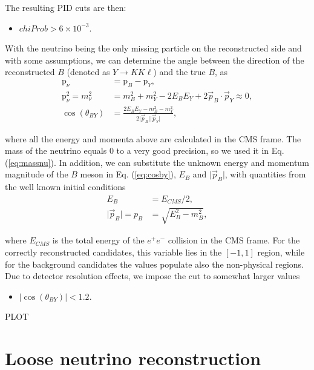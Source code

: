 \documentclass[oneside,a4paper,openany,12pt]{scrbook}
\begin{document}
The resulting PID cuts are then:
\begin{itemize}
\item $chiProb > 6\times 10^{-3}$.
\end{itemize}

With the neutrino being the only missing particle on the reconstructed side and with some assumptions, we can determine the angle between the direction of the reconstructed $B$ (denoted as $Y \to K K \ell$) and the true $B$, as
\begin{align}
\mathrm{p}_\nu &= \mathrm{p}_B - \mathrm{p}_{Y}, \\
\label{eq:massnu}
\mathrm{p}_\nu^2 = m_\nu^2 &= m_B^2 + m_Y^2 - 2E_BE_Y + 2\vec{p}_B \cdot \vec{p}_Y \approx 0, \\ 
\label{eq:cosby}
\cos \left(\theta_{BY}\right) &= \frac{2E_BE_Y - m_B^2 - m_Y^2}{2\vert \vec{p}_B \vert \vert \vec{p}_Y\vert},
\end{align} 

where all the energy and momenta above are calculated in the CMS frame. The mass of the neutrino equals 0 to a very good precision, so we used it in Eq. (\ref{eq:massnu}). In addition, we can substitute the unknown energy and momentum magnitude of the $B$ meson in Eq. (\ref{eq:cosby}), $E_B$ and $\vert \vec{p}_B \vert$, with quantities from the well known initial conditions
\begin{align}
E_B &= E_{CMS} / 2,\\
\vert \vec{p}_B \vert = p_B &= \sqrt{E_B^2 - m_B^2},
\end{align} 

where $E_{CMS}$ is the total energy of the $e^+e^-$ collision in the CMS frame. For the correctly reconstructed candidates, this variable  lies in the $[-1,1]$ region, while for the background candidates the values populate also the non-physical regions. Due to detector resolution effects, we impose the cut to somewhat larger values
\begin{itemize}
\item $\vert \cos \left(\theta_{BY}\right) \vert < 1.2$.
\end{itemize}

\begin{center}
PLOT
\end{center}

\section{Loose neutrino reconstruction}
\end{document}
